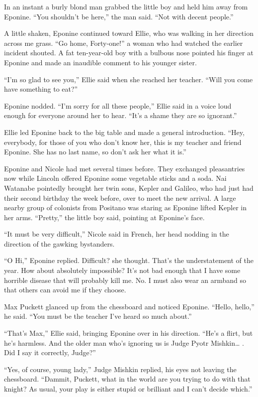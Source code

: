 \documentclass[]{article}
\begin{document}
{In an instant a burly blond man grabbed the little boy and held him away from Eponine.  “You shouldn’t be here,” the man said.  “Not with decent people.”

A little shaken, Eponine continued toward Ellie, who was walking in her direction across me grass.  “Go home, Forty-one!” a woman who had watched the earlier incident shouted.  A fat ten-year-old boy with a bulbous nose pointed his finger at Eponine and made an inaudible comment to his younger sister.

“I’m so glad to see you,” Ellie said when she reached her teacher.  “Will you come have something to eat?”

Eponine nodded.  “I’m sorry for all these people,” Ellie said in a voice loud enough for everyone around her to hear.  “It’s a shame they are so ignorant.”

Ellie led Eponine back to the big table and made a general introduction.  “Hey, everybody, for those of you who don’t know her, this is my teacher and friend Eponine.  She has no last name, so don’t ask her what it is.”

Eponine and Nicole had met several times before.  They exchanged pleasantries now while Lincoln offered Eponine some vegetable sticks and a soda.  Nai Watanabe pointedly brought her twin sons, Kepler and Galileo, who had just had their second birthday the week before, over to meet the new arrival.  A large nearby group of colonists from Positano was staring as Eponine lifted Kepler in her arms.  “Pretty,” the little boy said, pointing at Eponine’s face.

“It must be very difficult,” Nicole said in French, her head nodding in the direction of the gawking bystanders.

“O Hi,” Eponine replied.  Difficult? she thought.  That’s the understatement of the year.  How about absolutely impossible? It’s not bad enough that I have some horrible disease that will probably kill me.  No.  I must also wear an armband so that others can avoid me if they choose.

Max Puckett glanced up from the chessboard and noticed Eponine.  “Hello, hello,” he said.  “You must be the teacher I’ve heard so much about.”

“That’s Max,” Ellie said, bringing Eponine over in his direction.  “He’s a flirt, but he’s harmless.  And the older man who’s ignoring us is Judge Pyotr Mishkin… .  Did I say it correctly, Judge?”

“Yes, of course, young lady,” Judge Mishkin replied, his eyes not leaving the chessboard.  “Dammit, Puckett, what in the world are you trying to do with that knight? As usual, your play is either stupid or brilliant and I can’t decide which.”

}
\end{document}
